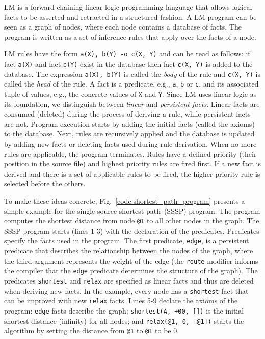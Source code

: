 \newcommand{\mytt}[1]{\texttt{#1}}
\newcommand{\comprehension}[3]{\{ \; #1; \; #2; \; #3 \; \}}
\newcommand{\aggregate}[6]{[\; #1 \Rightarrow #2; \; #3; \; #4; \; #5; \; #6 \;]}
\newcommand{\codemargin}[0]{0.7cm} 

LM is a forward-chaining linear logic programming language that allows logical
facts to be asserted and retracted in a structured fashion.  A LM program can be
seen as a graph of nodes, where each node contains a database of facts.  The
program is written as a set of inference rules that apply over the facts of a
node.

LM rules have the form \mytt{a(X), b(Y) -o c(X, Y)} and can be read as follows:
if fact \mytt{a(X)} and fact \mytt{b(Y)} exist in the database then fact
\mytt{c(X, Y)} is added to the database. The expression \mytt{a(X), b(Y)} is
called the \emph{body} of the rule and \mytt{c(X, Y)} is called the \emph{head}
of the rule.  A fact is a predicate, e.g., \mytt{a}, \mytt{b} or \mytt{c}, and
its associated tuple of values, e.g., the concrete values of \mytt{X} and
\mytt{Y}. Since LM uses linear logic as its foundation, we distinguish between
\emph{linear} and \emph{persistent facts}. Linear facts are consumed (deleted)
during the process of deriving a rule, while persistent facts are not.  Program
execution starts by adding the initial facts (called the axioms) to the
database. Next, rules are recursively applied and the database is updated by
adding new facts or deleting facts used during rule derivation.  When no more
rules are applicable, the program terminates. Rules have a defined priority
(their position in the source file) and highest priority rules are fired first.
If a new fact is derived and there is a set of applicable rules to be fired, the
higher priority rule is selected before the others.

To make these ideas concrete, Fig.~\ref{code:shortest_path_program} presents a
simple example for the single source shortest path~(SSSP) program.  The program
computes the shortest distance from node \mytt{@1} to all other nodes in the
graph.  The SSSP program starts (lines 1-3) with the declaration of the
predicates.  Predicates specify the facts used in the program. The first
predicate, \mytt{edge}, is a persistent predicate that describes the
relationship between the nodes of the graph, where the third argument represents
the weight of the edge (the \mytt{route} modifier informs the compiler that the
\mytt{edge} predicate determines the structure of the graph).  The predicates
\mytt{shortest} and \mytt{relax} are specified as linear facts and thus are
deleted when deriving new facts.  In the example, every node has a
\mytt{shortest} fact that can be improved with new \mytt{relax} facts.  Lines
5-9 declare the axioms of the program: \mytt{edge} facts describe the graph;
\mytt{shortest(A, +00, [])} is the initial shortest distance (infinity) for all
nodes; and \mytt{relax(@1, 0, [@1])} starts the algorithm by setting the
distance from \mytt{@1} to \mytt{@1} to be 0.

